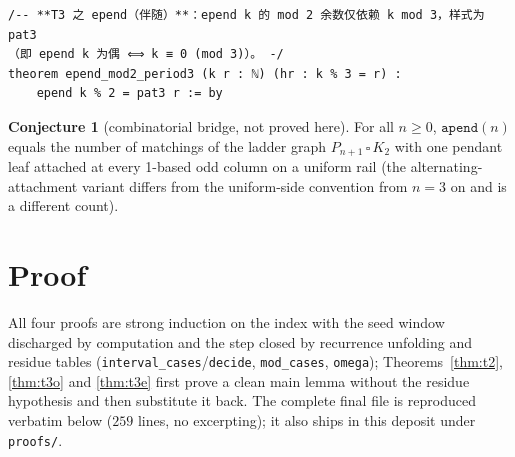 \documentclass[11pt]{article}
\theoremstyle{definition}
\newtheorem{conjecture}{Conjecture}
\begin{document}
\begin{lstlisting}[caption={Frozen formal statement, verbatim lines 109--112 of
\texttt{formalized/01-pend-statements.lean}: Theorem~\ref{thm:t3e}.},
label={lst:s4}]
/-- **T3 之 epend（伴随）**：epend k 的 mod 2 余数仅依赖 k mod 3，样式为 pat3
（即 epend k 为偶 ⟺ k ≡ 0 (mod 3)）。 -/
theorem epend_mod2_period3 (k r : ℕ) (hr : k % 3 = r) :
    epend k % 2 = pat3 r := by
\end{lstlisting}

\begin{conjecture}[combinatorial bridge, not proved here]\label{conj:bridge}
For all $n\ge 0$, $\mathtt{apend}(n)$ equals the number of matchings of the
ladder graph $P_{n+1}\,\square\,K_2$ with one pendant leaf attached at every
1-based odd column on a uniform rail (the alternating-attachment variant
differs from the uniform-side convention from $n=3$ on and is a different
count).
\end{conjecture}

\section{Proof}\label{sec:proof}

All four proofs are strong induction on the index with the seed window
discharged by computation and the step closed by recurrence unfolding and
residue tables (\texttt{interval\_cases}/\texttt{decide},
\texttt{mod\_cases}, \texttt{omega}); Theorems~\ref{thm:t2}, \ref{thm:t3o} and
\ref{thm:t3e} first prove a clean main lemma without the residue hypothesis
and then substitute it back. The complete final file is reproduced verbatim
below ($259$ lines, no excerpting); it also ships in this deposit under
\texttt{proofs/}.
\end{document}
